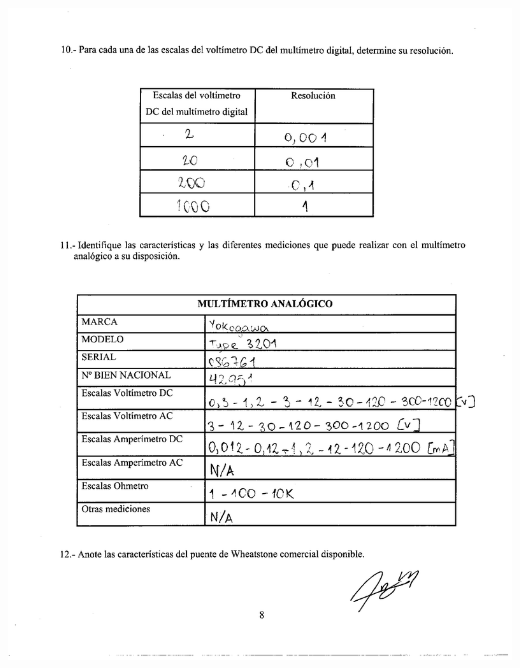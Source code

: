 \documentclass[12pt]{article}
\begin{document}
	\begin{center}
		\includegraphics[width=16cm,height=20cm]{Img/datos_lab_0005}
	\end{center}
\end{document}
